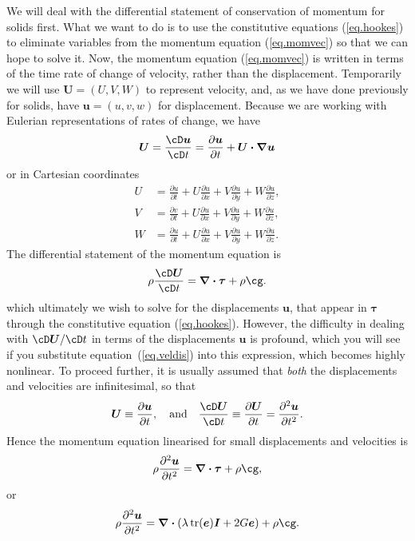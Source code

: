 \documentclass[a4paper,11pt]		{report}
\begin{document}
We will deal with the differential statement of conservation of
momentum for solids first. What we want to do is to use the
constitutive equations (\ref{eq.hookes}) to eliminate variables from
the momentum equation (\ref{eq.momvec}) so that we can hope to solve
it. Now, the momentum equation (\ref{eq.momvec}) is written in terms
of the time rate of change of velocity, rather than the
displacement. Temporarily we will use $\bm{U}=(U,V,W)$ to represent
velocity, and, as we have done previously for solids, have
$\bm{u}=(u,v,w)$ for displacement. Because we are working with
Eulerian representations of rates of change, we have
\begin{equation}
\bm{U}=\frac{\cD\bm{u}}{\cD t}=
\frac{\partial\bm{u}}{\partial t} + \bm{U\cdot\nabla u}
\label{eq.veldis}
\end{equation}
or in Cartesian coordinates
\begin{align}
U & = \frac{\partial u}{\partial t} +
 U\frac{\partial u}{\partial x} +
 V\frac{\partial u}{\partial y} +
 W\frac{\partial u}{\partial z}, \\
V & = \frac{\partial v}{\partial t} +
 U\frac{\partial u}{\partial x} +
 V\frac{\partial u}{\partial y} +
 W\frac{\partial u}{\partial z}, \\
W & = \frac{\partial u}{\partial t} +
 U\frac{\partial u}{\partial x} +
 V\frac{\partial u}{\partial y} +
 W\frac{\partial u}{\partial z}.
\end{align}
The differential statement of the momentum equation is
\begin{equation}
\rho\frac{\cD \bm{U}}{\cD t}=\bm{\nabla\cdot\tau} + \rho\bm{\cg}.
\end{equation}
which ultimately we wish to solve for the displacements $\bm{u}$, that
appear in $\bm{\tau}$ through the constitutive equation
(\ref{eq.hookes}). However, the difficulty in dealing with
$\cD\bm{U}/\cD t$ in terms of the displacements $\bm{u}$ is profound,
which you will see if you substitute equation~(\ref{eq.veldis}) into
this expression, which becomes highly nonlinear. To proceed further,
it is usually assumed that \emph{both} the displacements and
velocities are infinitesimal, so that
\[
\bm{U} \equiv \frac{\partial \bm{u}}{\partial t}, \quad\textrm{and}\quad
\frac{\cD \bm{U}}{\cD t}\equiv\frac{\partial\bm{U}}{\partial t}=
\frac{\partial^2 \bm{u}}{\partial t^2}.
\]
Hence the momentum equation linearised for small displacements and
velocities is
\begin{equation}
\rho\frac{\partial^2 \bm{u}}{\partial t^2}=\bm{\nabla\cdot\tau} + \rho\bm{\cg},
\end{equation}
or 
\begin{equation}
\rho\frac{\partial^2 \bm{u}}{\partial t^2}=
\bm{\nabla\cdot}\left(\lambda\,\mathrm{tr}(\bm{e})\bm{I} + 2 G\bm{e}\right) +
\rho\bm{\cg}.
\end{equation}
\end{document}
